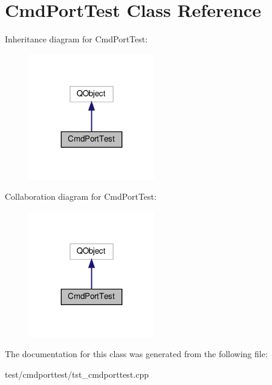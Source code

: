 \hypertarget{classCmdPortTest}{}\section{Cmd\+Port\+Test Class Reference}
\label{classCmdPortTest}


Inheritance diagram for Cmd\+Port\+Test\+:
\nopagebreak
\begin{figure}[H]
\begin{center}
\leavevmode
\includegraphics[width=155pt]{classCmdPortTest__inherit__graph}
\end{center}
\end{figure}


Collaboration diagram for Cmd\+Port\+Test\+:
\nopagebreak
\begin{figure}[H]
\begin{center}
\leavevmode
\includegraphics[width=155pt]{classCmdPortTest__coll__graph}
\end{center}
\end{figure}


The documentation for this class was generated from the following file\+:\begin{DoxyCompactItemize}
\item 
test/cmdporttest/tst\+\_\+cmdporttest.\+cpp\end{DoxyCompactItemize}
